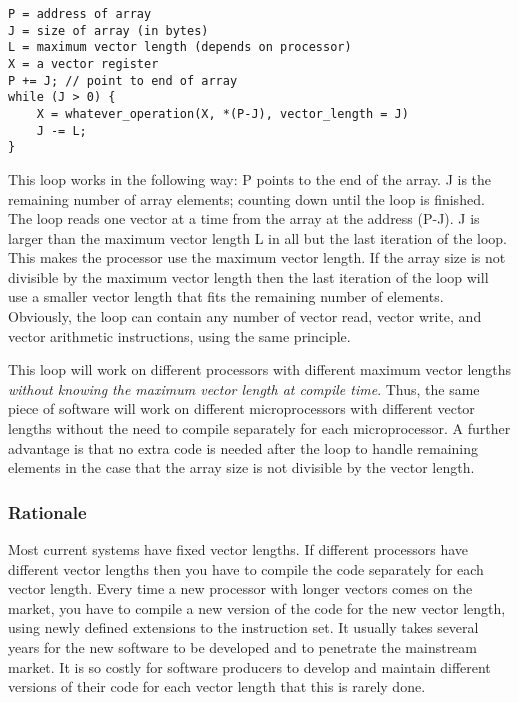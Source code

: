 \documentclass[forwardcom.tex]{subfiles}
\begin{document}
\begin{lstlisting}[frame=single]
P = address of array
J = size of array (in bytes)
L = maximum vector length (depends on processor)
X = a vector register
P += J; // point to end of array
while (J > 0) {
    X = whatever_operation(X, *(P-J), vector_length = J)
    J -= L;
}
\end{lstlisting}

This loop works in the following way: P points to the end of the array. J is the remaining number of array elements; counting down until the loop is finished. The loop reads one vector at a time from the array at the address (P-J). J is larger than the maximum vector length L in all but the last iteration of the loop. This makes the processor use the maximum vector length. If the array size is not divisible by the maximum vector length then the last iteration of the loop will use a smaller vector length that fits the remaining number of elements. Obviously, the loop can contain any number of vector read, vector write, and vector arithmetic instructions, using the same principle. 
\vspace{2mm}

This loop will work on different processors with different maximum vector lengths \textit{without knowing the maximum vector length at compile time}. Thus, the same piece of software will work on different microprocessors with different vector lengths without the need to compile separately for each microprocessor. A further advantage is that no extra code is needed after the loop to handle remaining elements in the case that the array size is not divisible by the vector length.

\subsubsection{Rationale}
Most current systems have fixed vector lengths. If different processors have different vector lengths then you have to compile the code separately for each vector length. Every time a new processor with longer vectors comes on the market, you have to compile a new version of the code for the new vector length, using newly defined extensions to the instruction set. It usually takes several years for the new software to be developed and to penetrate the mainstream market. It is so costly for software producers to develop and maintain different versions of their code for each vector length that this is rarely done.
\vspace{2mm}
\end{document}
